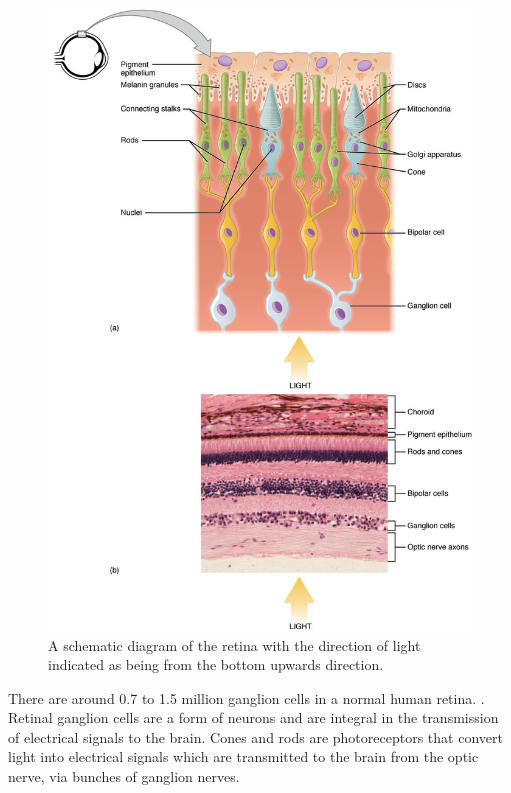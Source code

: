 \begin{figure}[htbp]
 \centering
   \includegraphics{figures/rods_and_cones}
 \caption{A schematic diagram of the retina with the direction of light indicated
 as being from the bottom upwards direction.}
 \label{fig:retina}
\end{figure}

There are around 0.7 to 1.5 million ganglion cells in a normal human retina.
\cite{curcio1990topography}. Retinal ganglion cells are a form of neurons and are integral in the transmission of electrical signals to the brain.
\cite{meyer1995characterization} Cones and rods are photoreceptors that
convert light into electrical signals which are transmitted to the
brain from the optic nerve, via bunches of ganglion nerves.

